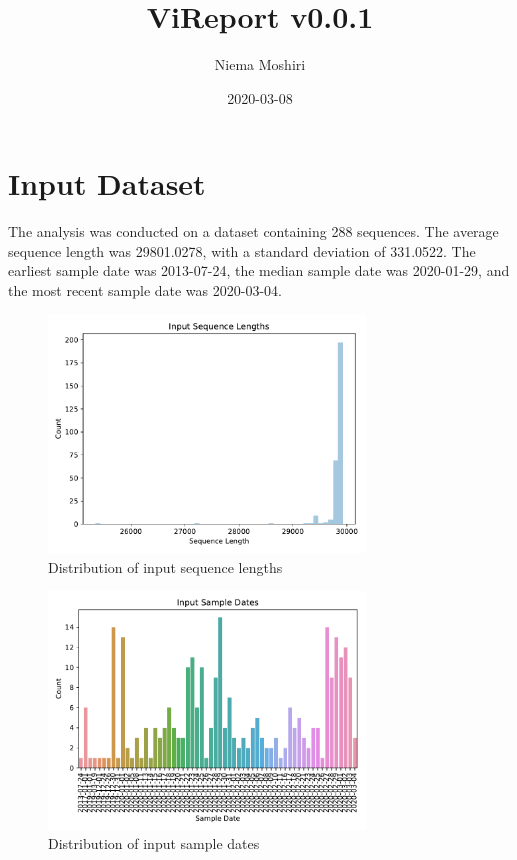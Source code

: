 \documentclass{article}
\title{\vspace{-2.0cm}ViReport v0.0.1}
\author{Niema Moshiri}
\date{2020-03-08}
\begin{document}
\maketitle

\section{Input Dataset}
The analysis was conducted on a dataset containing 288 sequences.
The average sequence length was 29801.0278,
with a standard deviation of 331.0522.
The earliest sample date was 2013-07-24,
the median sample date was 2020-01-29,
and the most recent sample date was 2020-03-04.


\begin{figure}[h]
\centering
\includegraphics[width=0.75\textwidth,keepaspectratio]{./figs/input_sequence_lengths.pdf}
\caption{Distribution of input sequence lengths}
\end{figure}



\begin{figure}[h]
\centering
\includegraphics[width=0.75\textwidth,keepaspectratio]{./figs/input_sample_dates.pdf}
\caption{Distribution of input sample dates}
\end{figure}
\end{document}
